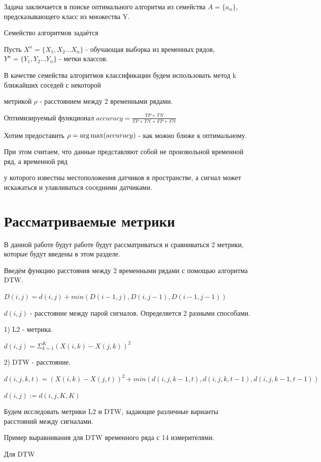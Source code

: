 \documentclass[12pt, twoside]{article}
\begin{document}
Задача заключается в поиске оптимального алгоритма из семейства $A = \{a_{\alpha}\}$, предсказывающего класс из множества Y.

Семейство алгоритмов задаётся 

Пусть $X^n = \{X_1, X_2 \dots X_n\}$ - обучающая выборка из временных рядов, $Y^n = \{Y_1, Y_2 \dots Y_n\}$ - метки классов.

В качестве семейства алгоритмов классификации будем использовать метод k ближайших соседей с некоторой

метрикой $\rho$ - расстоянием между 2 временными рядами.

Оптимизируемый функционал $accuracy = \frac{TP + TN}{TP + TN + FP + FN}$

Хотим предоставить $\rho = \argmax(accuracy)$ - как можно ближе к оптимальному.

При этом считаем, что данные представляют собой не произвольной временной ряд, а временной ряд

у которого известны местоположения датчиков в пространстве, а сигнал может искажаться и улавливаться соседними датчиками.


\section{Рассматриваемые метрики}

В данной работе будут работе будут рассматриваться и сравниваться 2 метрики, которые будут введены в этом разделе.

Введём функцию расстояния между 2 временными рядами с помощью алгоритма DTW.

$D(i, j) = d(i, j) + min(D(i - 1, j), D(i, j - 1), D(i - 1, j - 1))$

$d(i, j)$ - расстояние между парой сигналов. Определяется 2 разными способами.

1) L2 - метрика.

$d(i, j) = \Sigma_{k = 1}^K(X(i, k) - X(j, k))^2$

2) DTW - расстояние.

$d(i, j, k, t) = (X(i, k) - X(j, t)) ^ 2 + min(d(i, j, k - 1, t), d(i, j, k, t - 1), d(i, j, k - 1, t - 1))$

$d(i, j) := d(i, j, K, K)$

Будем исследовать метрики L2 и DTW, задающие различные варианты расстояний между сигналами. 

Пример выравнивания для DTW временного ряда с 14 измерителями.

Для DTW
\end{document}
